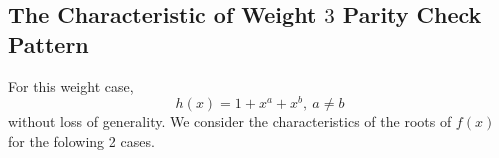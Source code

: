 

\subsection{The Characteristic of Weight $3$ Parity Check Pattern}
For this weight case, 
\begin{equation}
h(x)=1+x^a+x^b,~a\neq b
\label{novelEqwt3}
\end{equation}
without loss of generality. We consider the characteristics of the roots of $f(x)$ for the folowing 2 cases.

